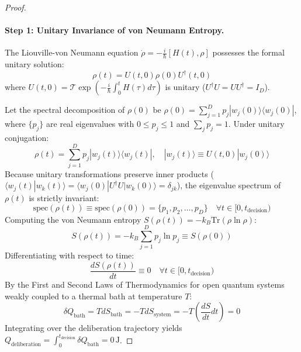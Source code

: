 \documentclass[10pt,twocolumn,3p]{article}
\begin{document}
\begin{proof}
\paragraph{Step 1: Unitary Invariance of von Neumann Entropy.}
The Liouville-von Neumann equation $\dot{\rho} = -\frac{i}{\hbar}[H(t), \rho]$ possesses the formal unitary solution:
\begin{equation}
    \rho(t) = U(t, 0) \rho(0) U^\dagger(t, 0)
\end{equation}
where $U(t, 0) = \mathcal{T} \exp\left( -\frac{i}{\hbar} \int_0^t H(\tau) d\tau \right)$ is unitary ($U^\dagger U = U U^\dagger = I_D$).

Let the spectral decomposition of $\rho(0)$ be $\rho(0) = \sum_{j=1}^D p_j |w_j(0)\rangle \langle w_j(0)|$, where $\{p_j\}$ are real eigenvalues with $0 \le p_j \le 1$ and $\sum_j p_j = 1$. Under unitary conjugation:
\begin{equation}
    \rho(t) = \sum_{j=1}^D p_j |w_j(t)\rangle \langle w_j(t)|, \quad |w_j(t)\rangle \equiv U(t, 0) |w_j(0)\rangle
\end{equation}
Because unitary transformations preserve inner products ($\langle w_j(t) | w_k(t) \rangle = \langle w_j(0) | U^\dagger U | w_k(0) \rangle = \delta_{jk}$), the eigenvalue spectrum of $\rho(t)$ is strictly invariant:
\begin{equation}
    \text{spec}(\rho(t)) \equiv \text{spec}(\rho(0)) = \{p_1, p_2, \dots, p_D\} \quad \forall t \in [0, t_{\text{decision}})
\end{equation}
Computing the von Neumann entropy $S(\rho(t)) = -k_B \text{Tr}(\rho \ln \rho)$:
\begin{equation}
    S(\rho(t)) = -k_B \sum_{j=1}^D p_j \ln p_j \equiv S(\rho(0))
\end{equation}
Differentiating with respect to time:
\begin{equation}
    \boxed{\frac{d S(\rho(t))}{dt} \equiv 0 \quad \forall t \in [0, t_{\text{decision}})}
\end{equation}
By the First and Second Laws of Thermodynamics for open quantum systems weakly coupled to a thermal bath at temperature $T$:
\begin{equation}
    \delta Q_{\text{bath}} = T dS_{\text{bath}} = -T dS_{\text{system}} = -T \left( \frac{dS}{dt} dt \right) = 0
\end{equation}
Integrating over the deliberation trajectory yields $Q_{\text{deliberation}} = \int_0^{t_{\text{decision}}} \delta Q_{\text{bath}} = 0\,\text{J}$.


\end{proof}
\end{document}
